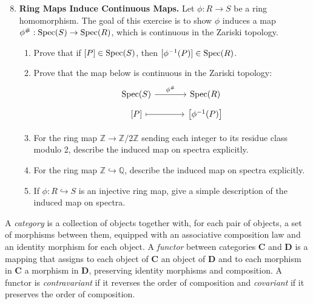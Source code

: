 \documentclass[12pt,reqno]{amsart}
\begin{document}
\begin{enumerate}[leftmargin=*]
 \setcounter{enumi}{7}
\item\label{ex:ring-maps-spec-maps} \textbf{Ring Maps Induce Continuous Maps.} Let $\phi:R \to S$ be a ring homomorphism. The goal of this exercise is to show $\phi$ induces a map $\phi^{\#}:\operatorname{Spec}(S) \to \operatorname{Spec}(R)$, which is continuous in the Zariski topology.
\begin{enumerate}[label=(\alph*),ref=\theenumi\alph*]
	 \item Prove that if $[P] \in \operatorname{Spec}(S)$, then $[\phi^{-1}(P)] \in  \operatorname{Spec}(R)$.
	 \item Prove that the map below is continuous in the Zariski topology:
	 \[
	 \begin{tikzcd}[row sep = .5em, column sep = 3.5em]
	 \Spec(S) \arrow[r,"\phi^{\#}"] & \Spec(R) \\
	 \left[P\right] \arrow[r,mapsto] & \left[ \phi^{-1}(P)\right]
	 \end{tikzcd}
	 \]
	 \item For the ring map $\mathbb Z \rightarrow \mathbb Z/2\mathbb Z$ sending each integer to its residue class modulo 2, describe the induced map on spectra explicitly.
	 \item For the ring map $\mathbb Z \hookrightarrow \mathbb Q$, describe the induced map on spectra explicitly.
	 \item If $\phi: R \hookrightarrow S$ is an injective ring map, give a simple description of the induced map on spectra. 
  \end{enumerate}
\end{enumerate}

\hrulefill

A \emph{category} is a collection of objects together with, for each pair of objects, a set of morphisms between them, equipped with an associative composition law and an identity morphism for each object. A \emph{functor} between categories $\textbf{C}$ and $\textbf{D}$ is a mapping that assigns to each object of $\textbf{C}$ an object of $\textbf{D}$ and to each morphism in $\textbf{C}$ a morphism in $\textbf{D}$, preserving identity morphisms and composition. A functor is \emph{contravariant} if it reverses the order of composition and \emph{covariant} if it preserves the order of composition.

\hrulefill
\end{document}
